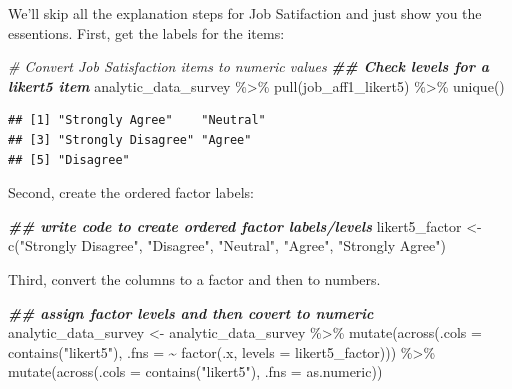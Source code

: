 \documentclass[
]{krantz}
\makeatletter
\newenvironment{Shaded}{\begin{snugshade}}{\end{snugshade}}
\newcommand{\AttributeTok}[1]{\textcolor[rgb]{0.61,0.61,0.61}{#1}}
\newcommand{\CommentTok}[1]{\textcolor[rgb]{0.37,0.37,0.37}{\textit{#1}}}
\newcommand{\DocumentationTok}[1]{\textcolor[rgb]{0.37,0.37,0.37}{\textbf{\textit{#1}}}}
\newcommand{\FunctionTok}[1]{\textcolor[rgb]{0,0,0}{#1}}
\newcommand{\NormalTok}[1]{#1}
\newcommand{\OtherTok}[1]{\textcolor[rgb]{0.37,0.37,0.37}{#1}}
\newcommand{\SpecialCharTok}[1]{\textcolor[rgb]{0,0,0}{#1}}
\newcommand{\StringTok}[1]{\textcolor[rgb]{0.5,0.5,0.5}{#1}}
\newenvironment{kframe}{%
\medskip{}
\setlength{\fboxsep}{.8em}
 \def\at@end@of@kframe{}%
 \ifinner\ifhmode%
  \def\at@end@of@kframe{\end{minipage}}%
  \begin{minipage}{\columnwidth}%
 \fi\fi%
 \def\FrameCommand##1{\hskip\@totalleftmargin \hskip-\fboxsep
 \colorbox{shadecolor}{##1}\hskip-\fboxsep
     \hskip-\linewidth \hskip-\@totalleftmargin \hskip\columnwidth}%
 \MakeFramed {\advance\hsize-\width
   \@totalleftmargin\z@ \linewidth\hsize
   \@setminipage}}%
 {\par\unskip\endMakeFramed%
 \at@end@of@kframe}
\renewenvironment{Shaded}{\begin{kframe}}{\end{kframe}}
\makeatother
\begin{document}
We'll skip all the explanation steps for Job Satifaction and just show you the essentions. First, get the labels for the items:

\begin{Shaded}
\begin{Highlighting}[]
\CommentTok{\# Convert Job Satisfaction items to numeric  values}
\DocumentationTok{\#\# Check levels for a likert5 item}
\NormalTok{analytic\_data\_survey }\SpecialCharTok{\%\textgreater{}\%}
  \FunctionTok{pull}\NormalTok{(job\_aff1\_likert5) }\SpecialCharTok{\%\textgreater{}\%}
  \FunctionTok{unique}\NormalTok{()}
\end{Highlighting}
\end{Shaded}

\begin{verbatim}
## [1] "Strongly Agree"    "Neutral"          
## [3] "Strongly Disagree" "Agree"            
## [5] "Disagree"
\end{verbatim}

Second, create the ordered factor labels:

\begin{Shaded}
\begin{Highlighting}[]
\DocumentationTok{\#\# write code to create ordered factor labels/levels}
\NormalTok{likert5\_factor }\OtherTok{\textless{}{-}} \FunctionTok{c}\NormalTok{(}\StringTok{"Strongly Disagree"}\NormalTok{,}
                    \StringTok{"Disagree"}\NormalTok{,}
                    \StringTok{"Neutral"}\NormalTok{,}
                    \StringTok{"Agree"}\NormalTok{,}
                    \StringTok{"Strongly Agree"}\NormalTok{)}
\end{Highlighting}
\end{Shaded}

Third, convert the columns to a factor and then to numbers.

\begin{Shaded}
\begin{Highlighting}[]
\DocumentationTok{\#\# assign factor levels and then covert to numeric}
\NormalTok{analytic\_data\_survey }\OtherTok{\textless{}{-}}\NormalTok{ analytic\_data\_survey }\SpecialCharTok{\%\textgreater{}\%}
  \FunctionTok{mutate}\NormalTok{(}\FunctionTok{across}\NormalTok{(}\AttributeTok{.cols =} \FunctionTok{contains}\NormalTok{(}\StringTok{"likert5"}\NormalTok{), }
                \AttributeTok{.fns =} \SpecialCharTok{\textasciitilde{}} \FunctionTok{factor}\NormalTok{(.x, }\AttributeTok{levels =}\NormalTok{ likert5\_factor))) }\SpecialCharTok{\%\textgreater{}\%}
  \FunctionTok{mutate}\NormalTok{(}\FunctionTok{across}\NormalTok{(}\AttributeTok{.cols =} \FunctionTok{contains}\NormalTok{(}\StringTok{"likert5"}\NormalTok{), }
                \AttributeTok{.fns =}\NormalTok{ as.numeric))}
\end{Highlighting}
\end{Shaded}
\end{document}
